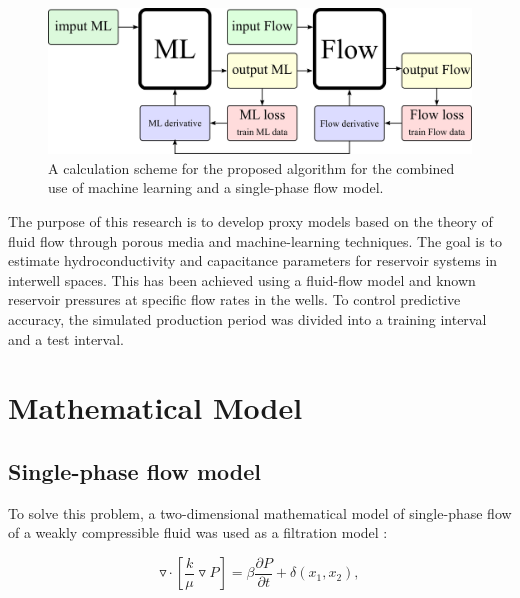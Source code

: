 \documentclass[
11pt,%
tightenlines,%
twoside,%
onecolumn,%
nofloats,%
nobibnotes,%
nofootinbib,%
superscriptaddress,%
noshowpacs,%
centertags]%
{revtex4}
\begin{document}
\begin{figure}
	\centering
	\includegraphics[width=0.7\linewidth]{fig0}
	\caption{A calculation scheme for the proposed algorithm for the combined use of machine learning and a single-phase flow model.}
	\label{fig:schime1}
\end{figure}

The purpose of this research is to develop proxy models based on the theory of fluid flow through porous media and machine-learning techniques. The goal is to estimate hydroconductivity and capacitance parameters for reservoir systems in interwell spaces. This has been achieved using a fluid-flow model and known reservoir pressures at specific flow rates in the wells. To control predictive accuracy, the simulated production period was divided into a training interval and a test interval.

\section{Mathematical Model}

\subsection{Single-phase flow model}
To solve this problem, a two-dimensional mathematical model of single-phase flow of a
weakly compressible fluid was used as a filtration model \cite{bas}:

\begin{equation} \label{fil}
	\triangledown \cdot \left[\frac{k}{\mu}\triangledown P \right] = \beta \frac{\partial P}{\partial t} + \delta(x_1,x_2),
\end{equation}
\end{document}

